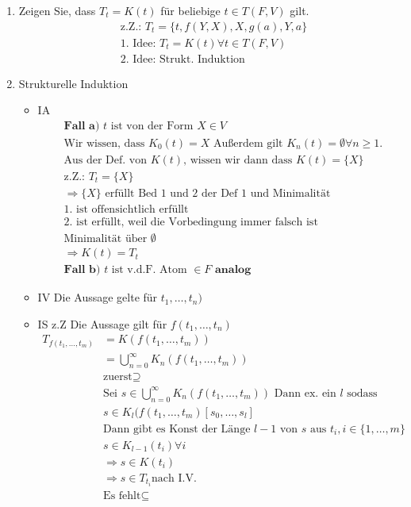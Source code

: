 \begin{enumerate}
	\item Zeigen Sie, dass \(T_{t} = K(t) \) für beliebige \(t \in T(F,V)\) gilt.
	\begin{align*}
	&\text{z.Z.: }T_{t} = \{t,f(Y,X),X,g(a),Y,a\}\\
	&\text{1. Idee: } T_{t} = K(t) \forall t \in T(F,V)\\
	&\text{2. Idee: Strukt. Induktion}
	\end{align*}
	\item Strukturelle Induktion
	\begin{itemize}
		\item IA
		\begin{align*}
		&\textbf{Fall a) } t \text{ ist von der Form } X\in V \\&\text{Wir wissen, dass } K_{0}(t) = {X} \text{ Außerdem gilt } K_{n}(t) = \emptyset \forall n \ge 1. \\&\text{Aus der Def. von  } K(t) \text{, wissen wir dann dass } K(t) = \{X\} \\&\text{z.Z.: } T_{t} = \{X\} \\& \Rightarrow \{X\} \text{ erfüllt Bed 1 und 2 der Def 1 und Minimalität}\\& \text{1. ist offensichtlich erfüllt} \\&\text{2. ist erfüllt, weil die Vorbedingung immer falsch ist} \\&\text{Minimalität über } \emptyset \\&\Rightarrow K(t) = T_{t} \\&\textbf{Fall b) }t \text{ ist v.d.F. Atom } \in F \textbf{ analog}
		\end{align*}
		\item IV Die Aussage gelte für \(t_{1},\ldots,t_{n})\)
		\item IS z.Z Die Aussage gilt für \(f(t_{1},\ldots,t_{n}) \)
		\begin{align*}
		T_{f(t_{1},\ldots,t_{m})}&=K(f(t_{1},\ldots,t_{m}))\\&=\bigcup_{n = 0}^\infty {K_{n}(f(t_{1},\ldots,t_{m}))}\\&\text{zuerst} \supseteq \\&\text{Sei } s\in \bigcup_{n = 0}^\infty {K_{n}(f(t_{1},\ldots,t_{m}))} \text{ Dann ex. ein }l\text{ sodass } \\& s\in K_{l}(f(t_{1},\ldots,t_{m}) [s_{0},\ldots,s_{l}] \\&\text{Dann gibt es Konst der Länge } l-1 \text{ von } s \text{ aus } t_{i}, i \in \{1,\ldots,m\} \\& s\in K_{l-1}(t_{i}) \forall i \\&\Rightarrow s\in K(t_{i}) \\&\Rightarrow s \in T_{t_{i}} \text{nach I.V.}\\& \text{Es fehlt} \subseteq 
		\end{align*}
	\end{itemize}
\end{enumerate}
